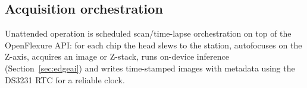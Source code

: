 \subsection{Acquisition orchestration}
Unattended operation is scheduled scan/time-lapse orchestration on top of the
OpenFlexure API: for each chip the head slews to the station, autofocuses on the
Z-axis, acquires an image or Z-stack, runs on-device inference
(Section~\ref{sec:edgeai}) and writes time-stamped images with metadata using
the DS3231 RTC for a reliable clock. 
